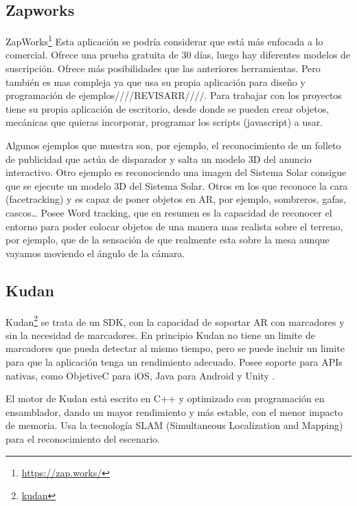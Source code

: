 \subsection{Zapworks} ZapWorks\footnote{\url{https://zap.works/}}
Esta aplicación se podría considerar que está más enfocada a lo comercial. Ofrece una prueba gratuita de 30 días, luego hay diferentes modelos de suscripción.
Ofrece más posibilidades que las anteriores herramientas. Pero también es mas compleja ya que usa su propia aplicación para diseño y programación de ejemplos////REVISARR////.
Para trabajar con los proyectos tiene su propia aplicación de escritorio, desde donde se pueden crear objetos, mecánicas que quieras incorporar, programar los scripts (javascript) a usar.

Algunos ejemplos que muestra son, por ejemplo, el reconocimiento de un folleto de publicidad que actúa de disparador y salta un modelo 3D del anuncio interactivo. Otro ejemplo es reconociendo una imagen del Sistema Solar consigue que se ejecute un modelo 3D del Sistema Solar. 
Otros en los que reconoce la cara (facetracking) y es capaz de poner objetos en AR, por ejemplo, sombreros, gafas, cascos…
Posee Word tracking, que en resumen es la capacidad de reconocer el entorno para poder colocar objetos de una manera mas realista sobre el terreno, por ejemplo, que de la sensación de que realmente esta sobre la mesa aunque vayamos moviendo el ángulo de la cámara.

\subsection{Kudan} Kudan\footnote{\href{https://www.xlsoft.com/en/products/kudan/index.html}{kudan}} 
se trata de un SDK, con la capacidad de soportar AR con marcadores y sin la necesidad de marcadores. En principio Kudan no tiene un limite de marcadores que pueda detectar al mismo tiempo, pero se puede incluir un limite para que la aplicación tenga un rendimiento adecuado. 
Posee soporte para APIs nativas, como ObjetiveC para iOS, Java para Android y Unity \cite{kudan_developer_hub}.

El motor de Kudan está escrito en C++ y optimizado con programación en ensamblador, dando un mayor rendimiento y más estable, con el menor impacto de memoria.
Usa la tecnología SLAM (Simultaneous Localization and Mapping) para el reconocimiento del escenario.


